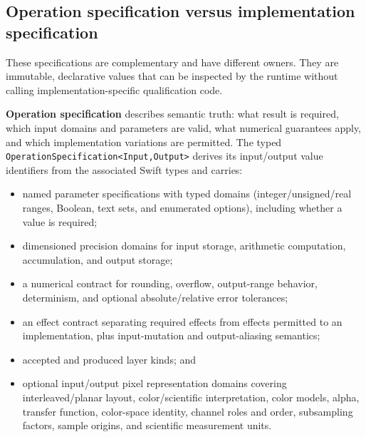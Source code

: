\documentclass[11pt,a4paper,oneside]{article}
\begin{document}
\subsection{Operation specification versus implementation specification}

These specifications are complementary and have different owners. They are immutable, declarative values that can be inspected by the runtime without calling implementation-specific qualification code.

\textbf{Operation specification} describes semantic truth: what result is required, which input domains and parameters are valid, what numerical guarantees apply, and which implementation variations are permitted. The typed \texttt{OperationSpecification<Input,Output>} derives its input/output value identifiers from the associated Swift types and carries:
\begin{itemize}
  \item named parameter specifications with typed domains (integer/unsigned/real ranges, Boolean, text sets, and enumerated options), including whether a value is required;
  \item dimensioned precision domains for input storage, arithmetic computation, accumulation, and output storage;
  \item a numerical contract for rounding, overflow, output-range behavior, determinism, and optional absolute/relative error tolerances;
  \item an effect contract separating required effects from effects permitted to an implementation, plus input-mutation and output-aliasing semantics;
  \item accepted and produced layer kinds; and
  \item optional input/output pixel representation domains covering interleaved/planar layout, color/scientific interpretation, color models, alpha, transfer function, color-space identity, channel roles and order, subsampling factors, sample origins, and scientific measurement units.
\end{itemize}
\end{document}
